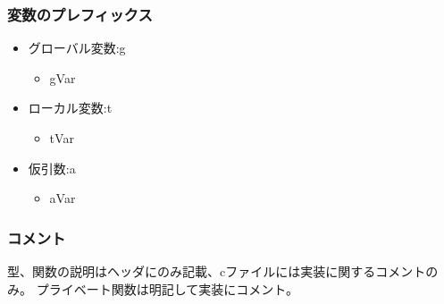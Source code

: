 \documentclass[a4paper,12pt]{jsarticle}
\begin{document}
\subsubsection*{変数のプレフィックス}
\begin{itemize}
  \item グローバル変数:g
        \begin{itemize}
          \item gVar
        \end{itemize}
  \item ローカル変数:t
        \begin{itemize}
          \item tVar
        \end{itemize}
  \item 仮引数:a
        \begin{itemize}
          \item aVar
        \end{itemize}
\end{itemize}

\subsubsection*{コメント}
型、関数の説明はヘッダにのみ記載、cファイルには実装に関するコメントのみ。
プライベート関数は明記して実装にコメント。




\end{document}

